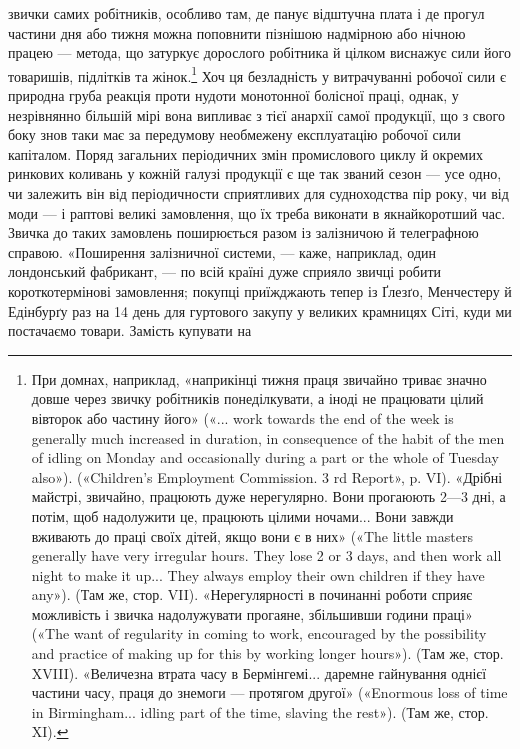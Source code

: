 \parcont{}  %
звички самих робітників, особливо там, де панує відштучна плата
і де прогул частини дня або тижня можна поповнити пізнішою
надмірною або нічною працею — метода, що затуркує дорослого
робітника й цілком виснажує сили його товаришів, підлітків та
жінок.\footnote{
При домнах, наприклад, «наприкінці тижня праця звичайно
триває значно довше через звичку робітників понеділкувати, а іноді не
працювати цілий вівторок або частину його» («... work towards the
end of the week is generally much increased in duration, in consequence
of the habit of the men of idling on Monday and occasionally during a part
or the whole of Tuesday also»). («Children’s Employment Commission.
3 rd Report», p. VI). «Дрібні майстрі, звичайно, працюють дуже нерегулярно.
Вони прогаюють 2—3 дні, а потім, щоб надолужити це, працюють
цілими ночами... Вони завжди вживають до праці своїх дітей, якщо вони
є в них» («The little masters generally have very irregular hours. They
lose 2 or 3 days, and then work all night to make it up... They always employ
their own children if they have any»). (Там же, стор. VII). «Нерегулярності
в починанні роботи сприяє можливість і звичка надолужувати прогаяне,
збільшивши години праці» («The want of regularity in coming to work,
encouraged by the possibility and practice of making up for this by working
longer hours»). (Там же, стор. XVIII). «Величезна втрата часу в Бермінгемі... даремне гайнування
однієї частини часу, праця до знемоги — протягом другої» («Enormous loss of time in Birmingham...
idling part of
the time, slaving the rest»). (Там же, стор. XI).
} Хоч ця безладність у витрачуванні робочої сили є
природна груба реакція проти нудоти монотонної болісної
праці, однак, у незрівнянно більшій мірі вона випливає з тієї
анархії самої продукції, що з свого боку знов таки має за передумову необмежену експлуатацію робочої
сили капіталом. Поряд
загальних періодичних змін промислового циклу й окремих ринкових коливань у кожній галузі продукції
є ще так званий сезон — усе одно, чи залежить він від періодичности сприятливих
для судноходства пір року, чи від моди — і раптові великі замовлення, що їх треба виконати в
якнайкоротший час. Звичка до
таких замовлень поширюється разом із залізничою й телеграфною справою. «Поширення залізничної
системи, — каже, наприклад, один лондонський фабрикант, — по всій країні дуже сприяло
звичці робити короткотермінові замовлення; покупці приїжджають тепер із Ґлезґо, Менчестеру й
Едінбурґу раз на 14 день
для гуртового закупу у великих крамницях Сіті, куди ми постачаємо товари. Замість купувати на
